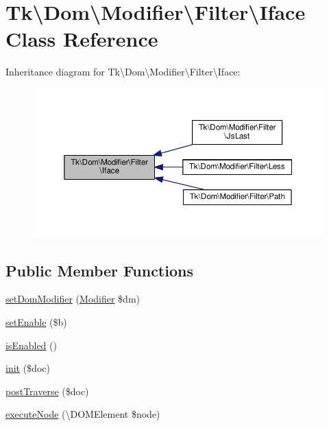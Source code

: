 \hypertarget{classTk_1_1Dom_1_1Modifier_1_1Filter_1_1Iface}{\section{Tk\textbackslash{}Dom\textbackslash{}Modifier\textbackslash{}Filter\textbackslash{}Iface Class Reference}
\label{classTk_1_1Dom_1_1Modifier_1_1Filter_1_1Iface}
}


Inheritance diagram for Tk\textbackslash{}Dom\textbackslash{}Modifier\textbackslash{}Filter\textbackslash{}Iface\+:\nopagebreak
\begin{figure}[H]
\begin{center}
\leavevmode
\includegraphics[width=350pt]{classTk_1_1Dom_1_1Modifier_1_1Filter_1_1Iface__inherit__graph}
\end{center}
\end{figure}
\subsection*{Public Member Functions}
\begin{DoxyCompactItemize}
\item 
\hyperlink{classTk_1_1Dom_1_1Modifier_1_1Filter_1_1Iface_ad7ca6a2844adf778d334d22dc1001785}{set\+Dom\+Modifier} (\hyperlink{classTk_1_1Dom_1_1Modifier_1_1Modifier}{Modifier} \$dm)
\item 
\hyperlink{classTk_1_1Dom_1_1Modifier_1_1Filter_1_1Iface_a9cb0edc59c7299b123f443cd8a9e8caf}{set\+Enable} (\$b)
\item 
\hyperlink{classTk_1_1Dom_1_1Modifier_1_1Filter_1_1Iface_af2361ea31b54e2ed74feff865423e145}{is\+Enabled} ()
\item 
\hyperlink{classTk_1_1Dom_1_1Modifier_1_1Filter_1_1Iface_a3fb21a70a41f94cfea4dce38bd4e13fc}{init} (\$doc)
\item 
\hyperlink{classTk_1_1Dom_1_1Modifier_1_1Filter_1_1Iface_a05cb828e17a22aa923f36bfc81c41335}{post\+Traverse} (\$doc)
\item 
\hyperlink{classTk_1_1Dom_1_1Modifier_1_1Filter_1_1Iface_a987e5c74d9365b6cd1be7a9a5b768bbf}{execute\+Node} (\textbackslash{}D\+O\+M\+Element \$node)
\end{DoxyCompactItemize}
